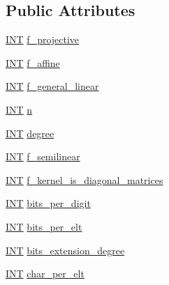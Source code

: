 \subsection*{Public Attributes}
\begin{DoxyCompactItemize}
\item 
\mbox{\hyperlink{galois_8h_a09fddde158a3a20bd2dcadb609de11dc}{I\+NT}} \mbox{\hyperlink{classmatrix__group_a1b86a92760348b446c97d4031983f834}{f\+\_\+projective}}
\item 
\mbox{\hyperlink{galois_8h_a09fddde158a3a20bd2dcadb609de11dc}{I\+NT}} \mbox{\hyperlink{classmatrix__group_ab8a15768d890b1336a25482220dc9cb1}{f\+\_\+affine}}
\item 
\mbox{\hyperlink{galois_8h_a09fddde158a3a20bd2dcadb609de11dc}{I\+NT}} \mbox{\hyperlink{classmatrix__group_a71e28c351e58e533a5c6d735c0917b4b}{f\+\_\+general\+\_\+linear}}
\item 
\mbox{\hyperlink{galois_8h_a09fddde158a3a20bd2dcadb609de11dc}{I\+NT}} \mbox{\hyperlink{classmatrix__group_a7fa23c582338a8dd30fce932cc1b950d}{n}}
\item 
\mbox{\hyperlink{galois_8h_a09fddde158a3a20bd2dcadb609de11dc}{I\+NT}} \mbox{\hyperlink{classmatrix__group_aa1ba6e1b1e0a9a52b4fa2dd28b857c0f}{degree}}
\item 
\mbox{\hyperlink{galois_8h_a09fddde158a3a20bd2dcadb609de11dc}{I\+NT}} \mbox{\hyperlink{classmatrix__group_a25b03f9f93dcced3aaa256934de3b20c}{f\+\_\+semilinear}}
\item 
\mbox{\hyperlink{galois_8h_a09fddde158a3a20bd2dcadb609de11dc}{I\+NT}} \mbox{\hyperlink{classmatrix__group_ac15f870c35c462a995047c1f4154262c}{f\+\_\+kernel\+\_\+is\+\_\+diagonal\+\_\+matrices}}
\item 
\mbox{\hyperlink{galois_8h_a09fddde158a3a20bd2dcadb609de11dc}{I\+NT}} \mbox{\hyperlink{classmatrix__group_a8f7cab63148c716abdd0e019caaf5548}{bits\+\_\+per\+\_\+digit}}
\item 
\mbox{\hyperlink{galois_8h_a09fddde158a3a20bd2dcadb609de11dc}{I\+NT}} \mbox{\hyperlink{classmatrix__group_af94fb92091c1d36a1080c3911862e788}{bits\+\_\+per\+\_\+elt}}
\item 
\mbox{\hyperlink{galois_8h_a09fddde158a3a20bd2dcadb609de11dc}{I\+NT}} \mbox{\hyperlink{classmatrix__group_ac9da8df618dc5b3184dce8d62416e8d8}{bits\+\_\+extension\+\_\+degree}}
\item 
\mbox{\hyperlink{galois_8h_a09fddde158a3a20bd2dcadb609de11dc}{I\+NT}} \mbox{\hyperlink{classmatrix__group_aa4a4a5ec3661581539d2117ddf61b401}{char\+\_\+per\+\_\+elt}}
\item 

\end{DoxyCompactItemize}
